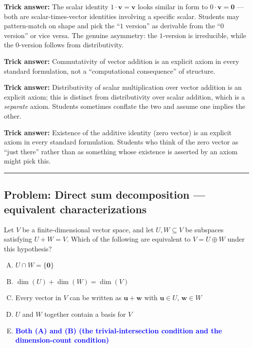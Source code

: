 \documentclass[12pt]{amsart}
\newcommand{\divider}{
  \vspace{-1em}
  \noindent
  \raisebox{-0.15ex}{\textbullet}%
  \hspace{0.5em}%
  \rule[0.5ex]{0.95\textwidth}{1.0pt}%
  \hspace{0.5em}%
  \raisebox{-0.15ex}{\textbullet}%
  \vspace{0em}
}
\begin{document}
\textbf{Trick answer:}
The scalar identity $1 \cdot \mathbf{v} = \mathbf{v}$ looks similar in form
to $0 \cdot \mathbf{v} = \mathbf{0}$ --- both are scalar-times-vector
identities involving a specific scalar. Students may pattern-match on shape
and pick the ``$1$ version'' as derivable from the ``$0$ version'' or vice
versa. The genuine asymmetry: the $1$-version is irreducible, while the
$0$-version follows from distributivity.

\textbf{Trick answer:}
Commutativity of vector addition is an explicit axiom in every standard
formulation, not a ``computational consequence'' of structure.

\textbf{Trick answer:}
Distributivity of scalar multiplication over vector addition is an explicit
axiom; this is distinct from distributivity over scalar addition, which is
a \emph{separate} axiom. Students sometimes conflate the two and assume one
implies the other.

\textbf{Trick answer:}
Existence of the additive identity (zero vector) is an explicit axiom in
every standard formulation. Students who think of the zero vector as
``just there'' rather than as something whose existence is asserted by an
axiom might pick this.

\divider

\subsection*{Problem: Direct sum decomposition --- equivalent characterizations}

Let $V$ be a finite-dimensional vector space, and let $U, W \subseteq V$ be
subspaces satisfying $U + W = V$. Which of the following are equivalent to
$V = U \oplus W$ under this hypothesis?

\begin{enumerate}[(A)]
\item $U \cap W = \{\mathbf{0}\}$
\item $\dim(U) + \dim(W) = \dim(V)$
\item Every vector in $V$ can be written as $\mathbf{u} + \mathbf{w}$ with $\mathbf{u} \in U$, $\mathbf{w} \in W$
\item $U$ and $W$ together contain a basis for $V$
\item \textcolor{blue}{\textbf{Both (A) and (B) (the trivial-intersection condition and the dimension-count condition)}}
\end{enumerate}
\end{document}
